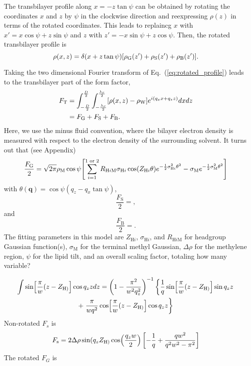 \documentclass[12pt,letterpaper]{article}
\newcommand{\zh}[1]{Z_{\mathrm{H}#1}}
\newcommand{\sigmah}[1]{\sigma_{\mathrm{H}#1}}
\newcommand{\sigmam}{\sigma_\mathrm{M}}
\newcommand{\rhom}{\rho_\mathrm{M}}
\newcommand{\rhog}{\rho_\mathrm{G}}
\newcommand{\rhos}{\rho_\mathrm{S}}
\newcommand{\rhob}{\rho_\mathrm{B}}
\newcommand{\rhow}{\rho_\mathrm{W}}
\newcommand{\rhm}[1]{R_{\mathrm{H}#1\mathrm{M}}}
\begin{document}
The transbilayer profile along $x=-z\tan\psi$ can be obtained by rotating
the coordinates $x$ and $z$ by $\psi$ in the clockwise direction and
reexpressing $\rho(z)$ in terms of the rotated coordinates. This leads
to replaincg $x$ with $x'=x\cos\psi+z\sin\psi$ and
$z$ with $z'=-x\sin\psi+z\cos\psi$. Then, the rotated transbilayer profile is
\begin{equation}
  \rho(x,z) = \delta(x+z\tan\psi)\bracks{\rhog(z') + \rhos(z') + \rhob(z')}.
  \label{eq:rotated_profile}
\end{equation}

Taking the two dimensional Fourier transform of Eq.~(\ref{eq:rotated_profile})
leads to the transbilayer part of the form factor,
\begin{align}
  F_\mathrm{T} 
  &= \int_{-\frac{D}{2}}^{\frac{D}{2}} \int_{-\frac{\lambda_r}{2}}^{\frac{\lambda_r}{2}} 
     \bracks{\rho(x,z)-\rhow} e^{i(q_xx+q_zz)} dxdz \\
  &= F_\mathrm{G} + F_\mathrm{S} + F_\mathrm{B}.
\end{align}
Here, we use the minus fluid convention, where the bilayer electron density
is measured with respect to the electron density of the surrounding solvent.
It turns out that (see Appendix)
\begin{equation}
  \frac{F_\mathrm{G}}{2} = \sqrt{2\pi}\rhom\cos\psi \bracks{
  \sum_{i=1}^{1\text{ or }2} \rhm{i}\sigmah{i}\cos(\zh{i}\theta) e^{-\frac{1}{2}\sigmah{i}^2\theta^2}
  -\sigmam e^{-\frac{1}{2}\sigmam^2\theta^2}}
\end{equation}
with $\theta(\mathbf{q})=\cos\psi(q_z-q_x\tan\psi)$,
\begin{equation}
  \frac{F_\mathrm{S}}{2} 
  = ,
\end{equation}
and
\begin{equation}
  \frac{F_\mathrm{B}}{2}
  = .
\end{equation}
The fitting parameters in this model are $\zh{i}$, $\sigmah{i}$, and 
$\rhm{i}$ for headgroup Gaussian function(s), $\sigmam$ for
the terminal methyl Gaussian, $\Delta\rho$ for the methylene region, $\psi$ for
the lipid tilt, and an overall scaling factor, totaling how many variable?


  
\begin{multline}
  \int \sin\bracks{\frac{\pi}{w}(z-\zh)} \cos q_zz dz
  = \left(1-\frac{\pi^2}{w^2q_z^2}\right)^{-1} 
  \left\{\frac{1}{q} \sin\bracks{\frac{\pi}{w}(z-\zh)} \sin q_zz\right. \\
  + \left.\frac{\pi}{wq^2}\cos\bracks{\frac{\pi}{w}(z-\zh)}\cos q_zz\right\}
\end{multline}
Non-rotated $F_s$ is
\begin{equation}
  F_\mathrm{s} = 2\Delta\rho\sin(q_z\zh)\cos\pars{\frac{q_zw}{2}}
                 \left[-\frac{1}{q}+\frac{qw^2}{q^2w^2-\pi^2}\right] 
\end{equation}
The rotated $F_G$ is
\end{document}
